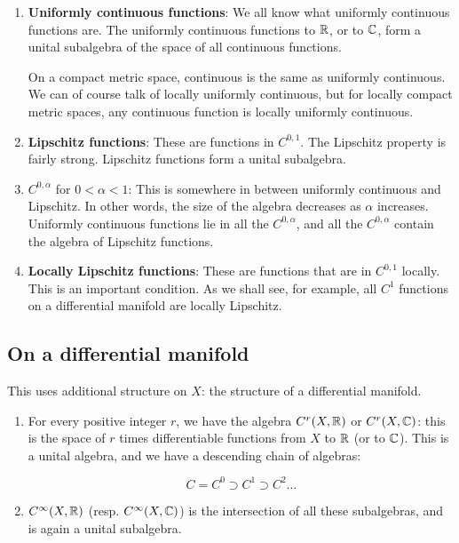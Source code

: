 \documentclass[a4paper]{amsart}
\begin{document}
\begin{enumerate}

\item {\bf Uniformly continuous functions}: We all know what uniformly
  continuous functions are. The uniformly continuous functions to
  $\mathbb{R}$, or to $\mathbb{C}$, form a unital subalgebra of the space of all
  continuous functions.

  On a compact metric space, continuous is the same as uniformly
  continuous. We can of course talk of locally uniformly continuous,
  but for locally compact metric spaces, any continuous function is
  locally uniformly continuous.

\item {\bf Lipschitz functions}: These are functions in $C^{0,1}$. The
  Lipschitz property is fairly strong. Lipschitz functions form a
  unital subalgebra.

\item $C^{0,\alpha}$ for $0 < \alpha < 1$: This is somewhere in
  between uniformly continuous and Lipschitz. In other words, the size
  of the algebra decreases as $\alpha$ increases. Uniformly continuous
  functions lie in all the $C^{0,\alpha}$, and all the $C^{0,\alpha}$
  contain the algebra of Lipschitz functions.

\item {\bf Locally Lipschitz functions}: These are functions that are
  in $C^{0,1}$ locally. This is an important condition. As we shall
  see, for example, all $C^1$ functions on a differential manifold are
  locally Lipschitz.

\end{enumerate}

\subsection{On a differential manifold}

This uses additional structure on $X$: the structure of a differential
manifold.

\begin{enumerate}

\item For every positive integer $r$, we have the algebra $C^r(X,\mathbb{R})$
  or $C^r(X,\mathbb{C})$: this is the space of $r$ times differentiable
  functions from $X$ to $\mathbb{R}$ (or to $\mathbb{C}$). This is a unital algebra,
  and we have a descending chain of algebras:

  $$C = C^0 \supset C^1 \supset C^2 \ldots $$

\item $C^\infty(X,\mathbb{R})$ (resp. $C^\infty(X,\mathbb{C})$) is the intersection of
  all these subalgebras, and is again a unital subalgebra.

\end{enumerate}
\end{document}
